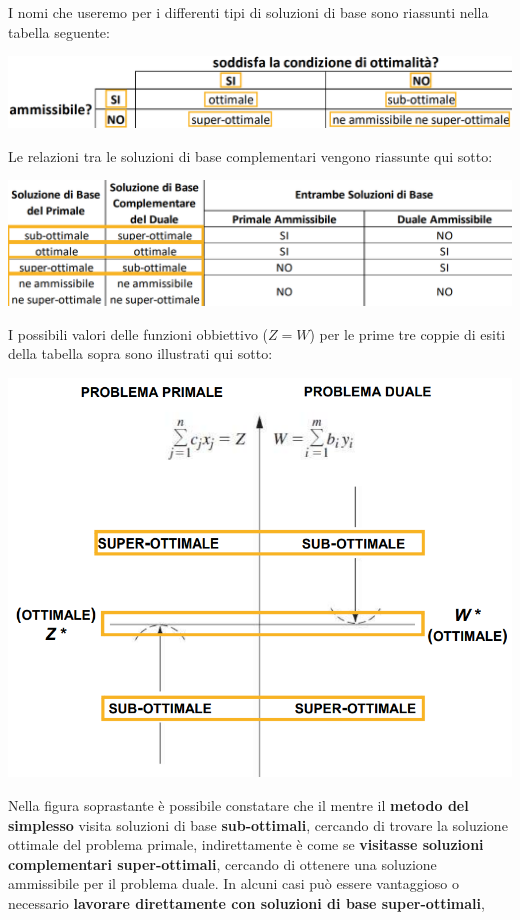 \documentclass[12pt]{article}
\begin{document}
I nomi che useremo per i differenti tipi di soluzioni di base sono riassunti nella tabella seguente:
\begin{center}
    \includegraphics[width = 1\linewidth]{Images/55.png}
\end{center}
Le relazioni tra le soluzioni di base complementari vengono riassunte qui sotto:
\begin{center}
    \includegraphics[width = 1\linewidth]{Images/56.png}
\end{center}
\newpage \noindent
I possibili valori delle funzioni obbiettivo ($Z = W$) per le prime tre coppie di esiti della tabella sopra sono illustrati qui sotto:
\begin{center}
    \includegraphics[width = 0.80\linewidth]{Images/57.png}
\end{center}
Nella figura soprastante è possibile constatare che il mentre il \textbf{metodo del simplesso} visita soluzioni di base \textbf{sub-ottimali}, cercando di trovare la soluzione ottimale del problema primale,
indirettamente è come se \textbf{visitasse soluzioni complementari super-ottimali}, cercando di ottenere una soluzione ammissibile per il problema duale. In alcuni casi può essere vantaggioso o necessario \textbf{lavorare direttamente con soluzioni di base super-ottimali},
\end{document}
